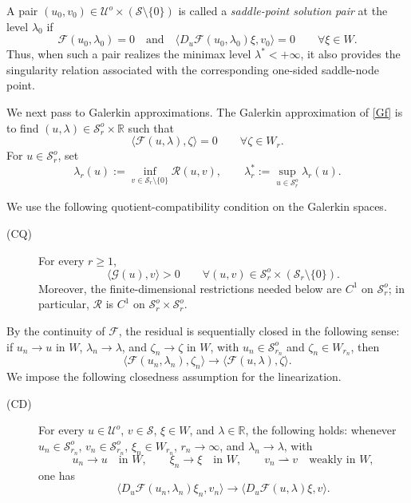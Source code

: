 \documentclass[preprint,10pt]{elsarticle}
\numberwithin{equation}{section}
\begin{document}
A pair \((u_0,v_0)\in\mathcal U^o\times(\mathcal S\setminus\{0\})\) is called
a \emph{saddle-point solution pair} at the level \(\lambda_0\) if
\[
\mathcal F(u_0,\lambda_0)=0
\quad\text{and}\quad
\bigl\langle D_u\mathcal F(u_0,\lambda_0)\xi,v_0\bigr\rangle=0
\qquad \forall \xi\in W .
\]
Thus, when such a pair realizes the minimax level \(\lambda^*<+\infty\), it
also provides the singularity relation associated with the corresponding
one-sided saddle-node point.

We next pass to Galerkin approximations. The Galerkin approximation of
\eqref{Gf} is to find
\((u,\lambda)\in\mathcal S_r^o\times\mathbb R\) such that
\begin{equation}\label{eq:AppEq}
	\langle\mathcal F(u,\lambda),\zeta\rangle=0
	\qquad \forall \zeta\in W_r .
\end{equation}
For \(u\in\mathcal S_r^o\), set
\[
\lambda_r(u):=
\inf_{v\in\mathcal S_r\setminus\{0\}}\mathcal R(u,v),
\qquad
\lambda_r^*:=
\sup_{u\in\mathcal S_r^o}\lambda_r(u).
\]

We use the following quotient-compatibility condition on the Galerkin spaces.
\begin{description}
	\item[{\rm (CQ)}]
	For every \(r\ge1\),
	\[
	\langle\mathcal G(u),v\rangle>0
	\qquad
	\forall (u,v)\in
	\mathcal S_r^o\times(\mathcal S_r\setminus\{0\}).
	\]
	Moreover, the finite-dimensional restrictions needed below are \(C^1\) on
	\(\mathcal S_r^o\); in particular, \(\mathcal R\) is \(C^1\) on
	\(\mathcal S_r^o\times\mathcal S_r^o\).
\end{description}

By the continuity of \(\mathcal F\), the residual is sequentially closed in
the following sense: if \(u_n\to u\) in \(W\), \(\lambda_n\to\lambda\), and
\(\zeta_n\to\zeta\) in \(W\), with \(u_n\in\mathcal S_{r_n}^o\) and
\(\zeta_n\in W_{r_n}\), then
\[
\langle\mathcal F(u_n,\lambda_n),\zeta_n\rangle
\to
\langle\mathcal F(u,\lambda),\zeta\rangle .
\]
We impose the following closedness assumption for the linearization.
\begin{description}
	\item[{\rm (CD)}]
	For every \(u\in\mathcal U^o\), \(v\in\mathcal S\),
	\(\xi\in W\), and \(\lambda\in\mathbb R\), the following holds:
	whenever \(u_n\in\mathcal S_{r_n}^o\),
	\(v_n\in\mathcal S_{r_n}^o\), \(\xi_n\in W_{r_n}\),
	\(r_n\to\infty\), and \(\lambda_n\to\lambda\), with
	\[
	u_n\to u \quad\text{in }W,\qquad
	\xi_n\to\xi \quad\text{in }W,\qquad
	v_n\rightharpoonup v \quad\text{weakly in }W,
	\]
	one has
	\[
	\bigl\langle
	D_u\mathcal F(u_n,\lambda_n)\xi_n,v_n
	\bigr\rangle
	\to
	\bigl\langle
	D_u\mathcal F(u,\lambda)\xi,v
	\bigr\rangle .
	\]
\end{description}
\end{document}
